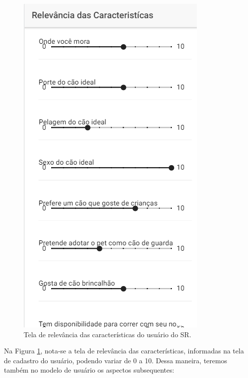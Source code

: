 \documentclass[portuguese]{textolivre}
\begin{document}
\begin{figure}[H]
	\centering
	\includegraphics[scale=0.90]{imagens/fig-013.png}
	\caption{Tela de relevância das características do usuário do SR.}
	\label{fig:013}
\end{figure}

Na Figura  \ref{fig:013}, nota-se a tela de relevância das características, informadas na tela de cadastro do usuário, podendo variar de 0 a 10. Dessa maneira, teremos também no modelo de usuário os aspectos subsequentes:
\end{document}
